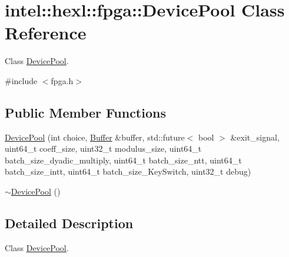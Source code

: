\hypertarget{classintel_1_1hexl_1_1fpga_1_1DevicePool}{\section{intel\-:\-:hexl\-:\-:fpga\-:\-:Device\-Pool Class Reference}
\label{classintel_1_1hexl_1_1fpga_1_1DevicePool}
}


Class \hyperlink{classintel_1_1hexl_1_1fpga_1_1DevicePool}{Device\-Pool}.  




{\ttfamily \#include $<$fpga.\-h$>$}

\subsection*{Public Member Functions}
\begin{DoxyCompactItemize}
\item 
\hyperlink{classintel_1_1hexl_1_1fpga_1_1DevicePool_a7c814d5346201aa0034e8f693e608bb2}{Device\-Pool} (int choice, \hyperlink{classintel_1_1hexl_1_1fpga_1_1Buffer}{Buffer} \&buffer, std\-::future$<$ bool $>$ \&exit\-\_\-signal, uint64\-\_\-t coeff\-\_\-size, uint32\-\_\-t modulus\-\_\-size, uint64\-\_\-t batch\-\_\-size\-\_\-dyadic\-\_\-multiply, uint64\-\_\-t batch\-\_\-size\-\_\-ntt, uint64\-\_\-t batch\-\_\-size\-\_\-intt, uint64\-\_\-t batch\-\_\-size\-\_\-\-Key\-Switch, uint32\-\_\-t debug)
\item 
\hyperlink{classintel_1_1hexl_1_1fpga_1_1DevicePool_af8404b1e8d112a2bd8c89e980dd69354}{$\sim$\-Device\-Pool} ()
\end{DoxyCompactItemize}


\subsection{Detailed Description}
Class \hyperlink{classintel_1_1hexl_1_1fpga_1_1DevicePool}{Device\-Pool}. 

